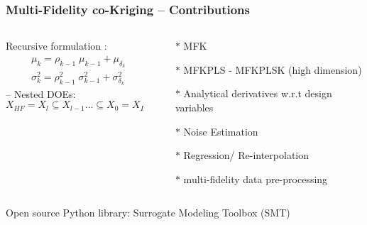 \documentclass{beamer}
\theoremstyle{remark}
\theoremstyle{plain}
\begin{document}
\begin{frame}
	\frametitle{Multi-Fidelity co-Kriging -- Contributions}
    \begin{columns}
    \begin{column}{0.4\linewidth}
    \begin{center}
    
    \end{center}
    Recursive formulation \cite{legratiet:tel-00866770}:
    \begin{align*}
&\mu_{k} = \rho_{k-1}\;\mu_{k-1} + \mu_{\delta_k} \\
&\sigma^2_{k} = \rho_{k-1}^2\;\sigma^2_{k-1}+\sigma^2_{\delta_k} \label{eq:rec_sigma_l}
\end{align*}
-- Nested DOEs:\[X_{HF}=X_l \subseteq X_{l-1} \ldots  \subseteq X_0=X_{LF} \]

    \end{column}
    \begin{column}{0.6\linewidth}
    \scriptsize
    \begin{itemize}
    \item[$\ast$] MFK \cite{vauclin2015,MFK_OpenMDAO}
    \item[$\ast$] MFKPLS - MFKPLSK (high dimension)
    \item[$\ast$] Analytical derivatives w.r.t design variables
    \item[$\ast$] Noise Estimation
    \item[$\ast$] Regression/ Re-interpolation
    \item[$\ast$] multi-fidelity data pre-processing
    \end{itemize}
    \normalsize
    \end{column}
    \end{columns}
    \begin{columns}
    \begin{column}{0.75\linewidth}
    \small
    Open source Python library: Surrogate Modeling Toolbox (SMT)
    

\end{column}
\end{columns}
\end{frame}
\end{document}
